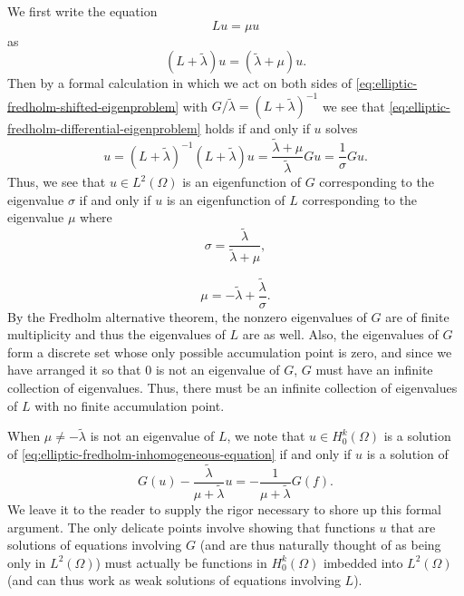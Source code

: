 \begin{Proof}
We first write the equation
\begin{equation}\label{eq:elliptic-fredholm-differential-eigenproblem}
Lu=\mu u
\end{equation}
as
\begin{equation}\label{eq:elliptic-fredholm-shifted-eigenproblem}
(L+\widetilde\lambda)u=(\widetilde\lambda+\mu)u.
\end{equation}
Then by a formal calculation in which we act on both sides of \eqref{eq:elliptic-fredholm-shifted-eigenproblem} with $G/\widetilde\lambda=(L+\widetilde\lambda)^{-1}$ we see that \eqref{eq:elliptic-fredholm-differential-eigenproblem} holds if and only if $u$ solves
\begin{equation}\label{eq:elliptic-fredholm-solution-operator-eigenrelation}
u=(L+\widetilde\lambda)^{-1}(L+\widetilde\lambda)u=\dfrac{\widetilde\lambda+\mu}{\widetilde\lambda}Gu=\dfrac{1}{\sigma}Gu.
\end{equation}
Thus, we see that $u\in L^2(\Omega)$ is an eigenfunction of $G$ corresponding to the eigenvalue $\sigma$ if and only if $u$ is an eigenfunction of $L$ corresponding to the eigenvalue $\mu$ where
\begin{equation}\label{eq:elliptic-fredholm-sigma-from-mu}
\sigma=\dfrac{\widetilde\lambda}{\widetilde\lambda+\mu},
\end{equation}

\begin{equation}\label{eq:elliptic-fredholm-mu-from-sigma}
\mu=-\widetilde\lambda+\dfrac{\widetilde\lambda}{\sigma}.
\end{equation}
By the Fredholm alternative theorem, the nonzero eigenvalues of $G$ are of finite multiplicity and thus the eigenvalues of $L$ are as well. Also, the eigenvalues of $G$ form a discrete set whose only possible accumulation point is zero, and since we have arranged it so that $0$ is not an eigenvalue of $G$, $G$ must have an infinite collection of eigenvalues. Thus, there must be an infinite collection of eigenvalues of $L$ with no finite accumulation point.

When $\mu\ne-\widetilde\lambda$ is not an eigenvalue of $L$, we note that $u\in H_0^k(\Omega)$ is a solution of \eqref{eq:elliptic-fredholm-inhomogeneous-equation} if and only if $u$ is a solution of
\begin{equation}\label{eq:elliptic-fredholm-equivalent-compact-equation}
G(u)-\dfrac{\widetilde\lambda}{\mu+\widetilde\lambda}u=-\dfrac{1}{\mu+\widetilde\lambda}G(f).
\end{equation}
We leave it to the reader to supply the rigor necessary to shore up this formal argument. The only delicate points involve showing that functions $u$ that are solutions of equations involving $G$ (and are thus naturally thought of as being only in $L^2(\Omega)$) must actually be functions in $H_0^k(\Omega)$ imbedded into $L^2(\Omega)$ (and can thus work as weak solutions of equations involving $L$).
\end{Proof}
